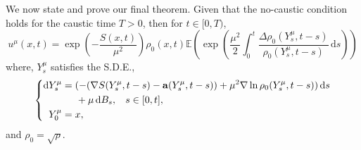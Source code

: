 \documentclass[a4paper,12pt,draft]{report}
\begin{document}
We now state and prove our final theorem.
\theorem
{
Given that the no-caustic condition holds for the caustic time $T > 0$, then for $t \in [0, T)$,
$$
u^\mu(x, t) = \exp\left(-\frac{S(x, t)}{\mu^2}\right)\rho_0(x, t)\mathbb{E}\left(\exp\left(\frac{\mu^2}{2}\int_0^t\frac{\Delta\rho_0(Y_s^\mu, t - s)}{\rho_0(Y_s^\mu, t - s)}\,\mathrm{d}s\right)\right)
$$
where, $Y_s^\mu$ satisfies the S.D.E.,
$$
\left\{
\begin{aligned}
\mathrm{d}Y_s^\mu & = (-(\nabla S(Y_s^\mu, t - s) - \mathbf{a}(Y_s^\mu, t - s)) + \mu^2\nabla\ln\rho_0(Y_s^\mu, t - s))\,\mathrm{d}s\\
& \hspace{0.5cm} + \mu\,\mathrm{d}B_s, \hspace{0.3cm} s \in [0, t],\\
Y_0^\mu & = x,
\end{aligned}
\right.
$$
and $\rho_0 = \sqrt{\rho}$.
}
\proof
\end{document}
